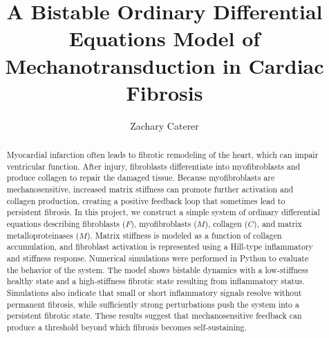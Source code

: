 \documentclass[Afour,sageh,times]{sagej}
\begin{document}

\title{A Bistable Ordinary Differential Equations Model of Mechanotransduction in Cardiac Fibrosis}

\author{Zachary Caterer}



\begin{abstract}

Myocardial infarction often leads to fibrotic remodeling of the heart, which can impair ventricular function. After injury, fibroblasts differentiate into myofibroblasts and produce collagen to repair the damaged tissue. Because myofibroblasts are mechanosensitive, increased matrix stiffness can promote further activation and collagen production, creating a positive feedback loop that sometimes lead to persistent fibrosis. In this project, we construct a simple system of ordinary differential equations describing fibroblasts ($F$), myofibroblasts ($M$), collagen ($C$), and matrix metalloproteinases ($M$). Matrix stiffness is modeled as a function of collagen accumulation, and fibroblast activation is represented using a Hill-type inflammatory and stiffness response. Numerical simulations were performed in Python to evaluate the behavior of the system. The model shows bistable dynamics with a low-stiffness healthy state and a high-stiffness fibrotic state resulting from inflammatory status. Simulations also indicate that small or short inflammatory signals resolve without permanent fibrosis, while sufficiently strong perturbations push the system into a persistent fibrotic state. These results suggest that mechanosensitive feedback can produce a threshold beyond which fibrosis becomes self-sustaining.

\end{abstract}



\maketitle
\end{document}
